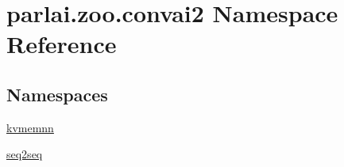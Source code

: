 \hypertarget{namespaceparlai_1_1zoo_1_1convai2}{}\section{parlai.\+zoo.\+convai2 Namespace Reference}
\label{namespaceparlai_1_1zoo_1_1convai2}
\subsection*{Namespaces}
\begin{DoxyCompactItemize}
\item 
 \hyperlink{namespaceparlai_1_1zoo_1_1convai2_1_1kvmemnn}{kvmemnn}
\item 
 \hyperlink{namespaceparlai_1_1zoo_1_1convai2_1_1seq2seq}{seq2seq}
\end{DoxyCompactItemize}
